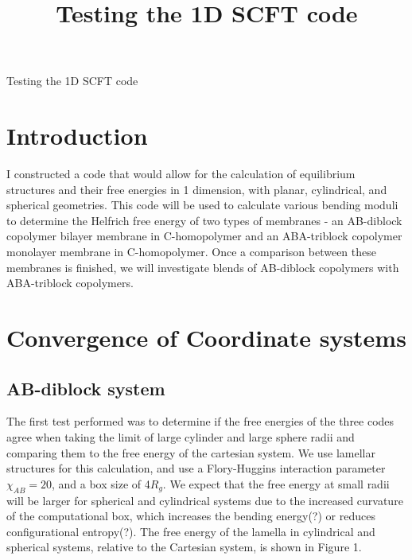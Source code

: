 \documentclass[11pt]{article} %
\title{Testing the 1D SCFT code}
\date{} %
\begin{document}
\large Testing the 1D SCFT code

\section{Introduction}

I constructed a code that would allow for the calculation of equilibrium structures and their free energies in 1 dimension, with planar, cylindrical, and spherical geometries. This code will be used to calculate various bending moduli to determine the Helfrich free energy of two types of membranes - an AB-diblock copolymer bilayer membrane in C-homopolymer and an ABA-triblock copolymer monolayer membrane in C-homopolymer. Once a comparison between these membranes is finished, we will investigate blends of AB-diblock copolymers with ABA-triblock copolymers.

\section{Convergence of Coordinate systems}
\subsection{AB-diblock system}

The first test performed was to determine if the free energies of the three codes agree when taking the limit of large cylinder and large sphere radii and comparing them to the free energy of the cartesian system. We use lamellar structures for this calculation, and use a Flory-Huggins interaction parameter $\chi_{AB}=20$, and a box size of 4$R_g$. We expect that the free energy at small radii will be larger for spherical and cylindrical systems due to the increased curvature of the computational box, which increases the bending energy(?) or reduces configurational entropy(?). The free energy of the lamella in cylindrical and spherical systems, relative to the Cartesian system, is shown in Figure 1.
\end{document}
